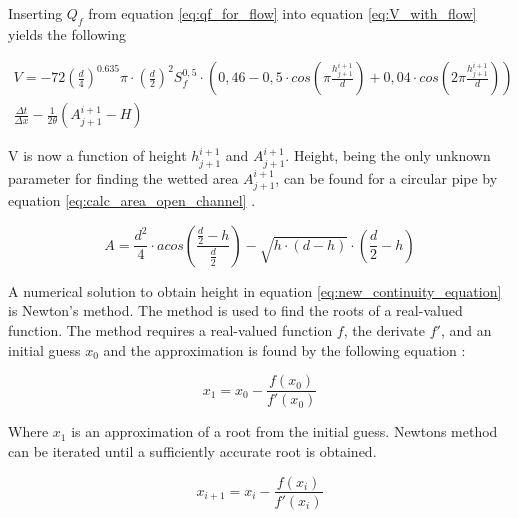 Inserting $Q_f$ from equation \ref{eq:qf_for_flow} into equation \ref{eq:V_with_flow} yields the following

\begin{equation}\label{eq:new_continuity_equation}
\begin{aligned}
    V = -72\left(\frac{d}{4}\right)^{0.635}\pi\cdot\left(\frac{d}{2}\right)^2S_f^{0,5}\cdot \left(0,46-0,5\cdot cos\left(\pi \frac{h_{j+1}^{i+1}}{d}\right)+ 0,04\cdot cos\left(2\pi\frac{h_{j+1}^{i+1}}{d}\right)\right)\\ \frac{\Delta t}{\Delta x}-\frac{1}{2\theta}\left(A_{j+1}^{i+1}-H\right)
\end{aligned}
\end{equation}

V is now a function of height $h_{j+1}^{i+1}$ and $A_{j+1}^{i+1}$. Height, being the only unknown parameter for finding the wetted area $A_{j+1}^{i+1}$, can be found for a circular pipe by equation \ref{eq:calc_area_open_channel} \cite{ikke_stationear}.

\begin{equation}\label{eq:calc_area_open_channel}
    A = \frac {d^2}{4} \cdot acos \left(\frac{\frac{d}{2}-h}{\frac{d}{2}}\right)-\sqrt{h\cdot (d-h)}\cdot  \left(\frac{d}{2}-h\right)
\end{equation}


A numerical solution to obtain height in equation \ref{eq:new_continuity_equation} is Newton's method. The method is used to find the roots of a real-valued function. The method requires a real-valued function $f$, the derivate $f'$, and an initial guess $x_0$ and the approximation is found by the following equation \cite{szymkiewicz2010numerical}:

\begin{equation}\label{eq:newtons_method_standard}
     x_1 = x_0 - \frac{f(x_0)}{f'(x_0)}
\end{equation} 

Where $x_1$ is an approximation of a root from the initial guess. Newtons method can be iterated until a sufficiently accurate root is obtained.

\begin{equation}\label{eq:newtons_method_standard}
     x_{i+1} = x_i - \frac{f(x_i)}{f'(x_i)}
\end{equation} 


